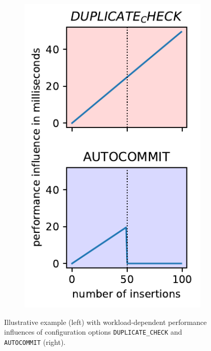 \begin{figure}
\begin{subfigure}[l]{0.63\linewidth}
	


\end{subfigure}
	\begin{subfigure}[l]{0.35\linewidth}
		\includegraphics[width=1\linewidth]{images/influences.pdf}
	\end{subfigure}
	\caption{Illustrative example (left) with workload-dependent performance influences of configuration options \texttt{DUPLICATE\_CHECK} and \texttt{AUTOCOMMIT} (right).}
	\label{fig:intro}
\end{figure}


